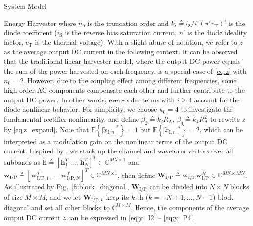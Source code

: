 \documentclass[journal]{IEEEtran}
\begin{document}
\begin{section}{System Model}
\begin{subsection}{Energy Harvester}
			where $n_0$ is the truncation order and $k_i \triangleq i_{\mathrm{S}}/i!(n'v_{\mathrm{T}})^i$ is the diode coefficient ($i_{\mathrm{S}}$ is the reverse bias saturation current, $n'$ is the diode ideality factor, $v_{\mathrm{T}}$ is the thermal voltage). With a slight abuse of notation, we refer to $z$ as the average output DC current in the following context. It can be observed that the traditional linear harvester model, where the output DC power equals the sum of the power harvested on each frequency, is a special case of \eqref{eq:z} with $n_0=2$. However, due to the coupling effect among different frequencies, some high-order AC components compensate each other and further contribute to the output DC power. In other words, even-order terms with $i \ge 4$ account for the diode nonlinear behavior. For simplicity, we choose $n_0=4$ to investigate the fundamental rectifier nonlinearity, and define $\beta_2 \triangleq {k_2}{R_{\mathrm{A}}}$, $\beta_4 \triangleq {k_4}{R_{\mathrm{A}}^2}$ to rewrite $z$ by \eqref{eq:z_expand}. Note that $\mathbb{E}\left\{\lvert\tilde{x}_{\mathrm{I},n}\rvert^2\right\}=1$ but $\mathbb{E}\left\{\lvert\tilde{x}_{\mathrm{I},n}\rvert^4\right\}=2$, which can be interpreted as a modulation gain on the nonlinear terms of the output DC current. Inspired by \cite{Huang2017}, we stack up the channel and waveform vectors over all subbands as $\boldsymbol{h} \triangleq [\boldsymbol{h}_1^T,\dots,\boldsymbol{h}_N^T]^T \in \mathbb{C}^{MN \times 1}$ and $\boldsymbol{w}_{\mathrm{I/P}} \triangleq [\boldsymbol{w}_{\mathrm{I/P},1}^T,\dots,\boldsymbol{w}_{\mathrm{I/P},N}^T]^T \in \mathbb{C}^{MN \times 1}$, then define $\boldsymbol{W}_{\mathrm{I/P}} \triangleq \boldsymbol{w}_{\mathrm{I/P}}\boldsymbol{w}_{\mathrm{I/P}}^H \in \mathbb{C}^{MN \times MN}$. As illustrated by Fig.~\ref{fi:block_diagonal}, $\boldsymbol{W}_{\mathrm{I/P}}$ can be divided into $N \times N$ blocks of size $M \times M$, and we let $\boldsymbol{W}_{\mathrm{I/P},k}$ keep its $k$-th ($k=-N+1,\dots,N-1$) block diagonal and set all other blocks to $\boldsymbol{0}^{M \times M}$. Hence, the components of the average output DC current $z$ can be expressed in \eqref{eq:y_I2} -- \eqref{eq:y_P4}.


\end{subsection}
\end{section}
\end{document}
